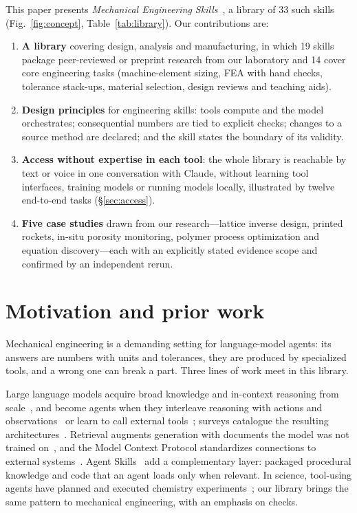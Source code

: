\documentclass[11pt]{article}
\begin{document}
This paper presents \emph{Mechanical Engineering Skills}~\cite{mes2026repo}, a library of 33 such
skills (Fig.~\ref{fig:concept}, Table~\ref{tab:library}). Our contributions are:
\begin{enumerate}[leftmargin=*]
\item \textbf{A library} covering design, analysis and manufacturing, in which 19 skills package
      peer-reviewed or preprint research from our laboratory and 14 cover core engineering tasks
      (machine-element sizing, FEA with hand checks, tolerance stack-ups, material selection,
      design reviews and teaching aids).
\item \textbf{Design principles} for engineering skills: tools compute and the model orchestrates;
      consequential numbers are tied to explicit checks; changes to a source method are declared;
      and the skill states the boundary of its validity.
\item \textbf{Access without expertise in each tool}: the whole library is reachable by text or
      voice in one conversation with Claude, without learning tool interfaces, training models or
      running models locally, illustrated by twelve end-to-end tasks (\S\ref{sec:access}).
\item \textbf{Five case studies} drawn from our research---lattice inverse design, printed rockets,
      in-situ porosity monitoring, polymer process optimization and equation discovery---each
      with an explicitly stated evidence scope and confirmed by an independent rerun.
\end{enumerate}


\section{Motivation and prior work}
\label{sec:related}

Mechanical engineering is a demanding setting for language-model agents: its answers are numbers
with units and tolerances, they are produced by specialized tools, and a wrong one can break a part.
Three lines of work meet in this library.

Large language models acquire broad knowledge and
in-context reasoning from scale~\cite{brown2020gpt3,wei2022cot}, and become agents when they
interleave reasoning with actions and observations~\cite{yao2023react} or learn to call external
tools~\cite{schick2023toolformer}; surveys catalogue the resulting architectures~\cite{wang2024agentsurvey}.
Retrieval augments generation with documents the model was not trained on~\cite{lewis2020rag},
and the Model Context Protocol standardizes connections to external systems~\cite{anthropic2024mcp}.
Agent Skills~\cite{anthropic2025skills,agentskills2025spec} add a complementary layer: packaged
procedural knowledge and code that an agent loads only when relevant. In science, tool-using
agents have planned and executed chemistry experiments~\cite{boiko2023coscientist,bran2024chemcrow};
our library brings the same pattern to mechanical engineering, with an emphasis on checks.
\end{document}

